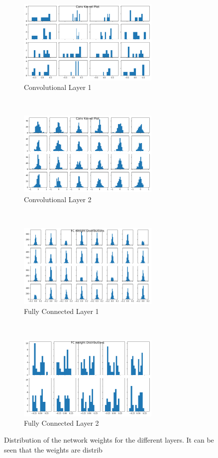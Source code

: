 \begin{figure}[htbp]
    \centering
    \begin{subfigure}[t]{0.5\textwidth}
        \centering
        \includegraphics[height=1.6in]{../../net/images/hist_cn1_k}
        \caption{Convolutional Layer 1}
    \end{subfigure}%
    ~ 
    \begin{subfigure}[t]{0.5\textwidth}
        \centering
         \includegraphics[height=1.6in]{../../net/images/hist_cn2_k}
        \caption{Convolutional Layer 2}
    \end{subfigure}%
    \\
    \begin{subfigure}[t]{0.5\textwidth}
        \centering
        \includegraphics[height=1.6in]{../../net/images/hist_fc1_w}
        \caption{Fully Connected Layer 1}
    \end{subfigure}%
    ~ 
    \begin{subfigure}[t]{0.5\textwidth}
        \centering
         \includegraphics[height=1.6in]{../../net/images/hist_fc2_w}
        \caption{Fully Connected Layer 2}
    \end{subfigure}
    \caption[Distribution of the network weights for the different layers]{Distribution of the network weights for the different layers. It can be seen that the weights are distrib}
    \label{fig:network-weight-distributions}
\end{figure}


